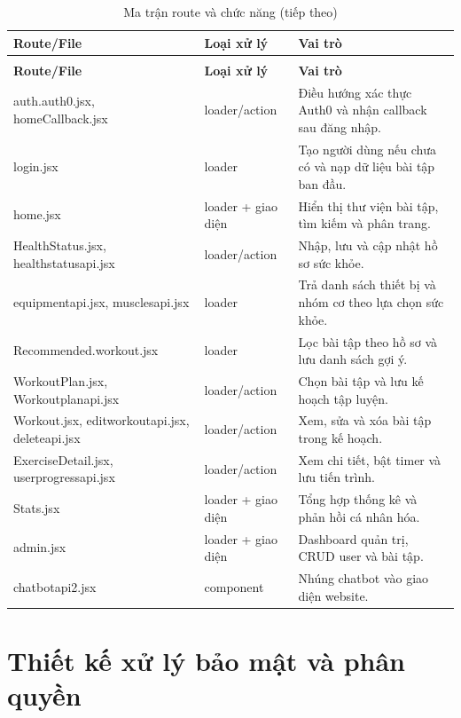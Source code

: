 \begingroup
\setlength{\tabcolsep}{3pt}
\renewcommand{\arraystretch}{1.25}
\begin{longtable}{|P{0.220\textwidth}|P{0.330\textwidth}|P{0.370\textwidth}|}
\caption{Ma trận route và chức năng}\\
\hline
\textbf{Route/File} & \textbf{Loại xử lý} & \textbf{Vai trò} \\
\hline
\endfirsthead
\caption[]{Ma trận route và chức năng (tiếp theo)}\\
\hline
\textbf{Route/File} & \textbf{Loại xử lý} & \textbf{Vai trò} \\
\hline
\endhead
auth.auth0.jsx, homeCallback.jsx & loader/action & Điều hướng xác thực Auth0 và nhận callback sau đăng nhập. \\
\hline
login.jsx & loader & Tạo người dùng nếu chưa có và nạp dữ liệu bài tập ban đầu. \\
\hline
home.jsx & loader + giao diện & Hiển thị thư viện bài tập, tìm kiếm và phân trang. \\
\hline
HealthStatus.jsx, healthstatusapi.jsx & loader/action & Nhập, lưu và cập nhật hồ sơ sức khỏe. \\
\hline
equipmentapi.jsx, musclesapi.jsx & loader & Trả danh sách thiết bị và nhóm cơ theo lựa chọn sức khỏe. \\
\hline
Recommended.workout.jsx & loader & Lọc bài tập theo hồ sơ và lưu danh sách gợi ý. \\
\hline
WorkoutPlan.jsx, Workoutplanapi.jsx & loader/action & Chọn bài tập và lưu kế hoạch tập luyện. \\
\hline
Workout.jsx, editworkoutapi.jsx, deleteapi.jsx & loader/action & Xem, sửa và xóa bài tập trong kế hoạch. \\
\hline
ExerciseDetail.jsx, userprogressapi.jsx & loader/action & Xem chi tiết, bật timer và lưu tiến trình. \\
\hline
Stats.jsx & loader + giao diện & Tổng hợp thống kê và phản hồi cá nhân hóa. \\
\hline
admin.jsx & loader + giao diện & Dashboard quản trị, CRUD user và bài tập. \\
\hline
chatbotapi2.jsx & component & Nhúng chatbot vào giao diện website. \\
\hline
\end{longtable}
\endgroup

\section{Thiết kế xử lý bảo mật và phân quyền}

